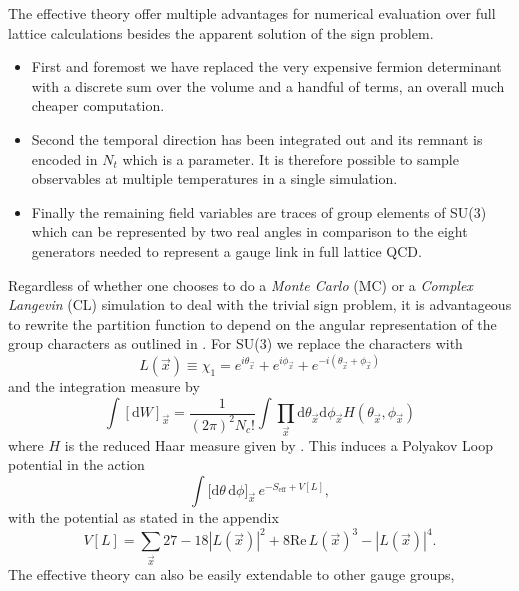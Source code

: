 The effective theory offer multiple advantages for numerical evaluation over
full lattice calculations besides the apparent solution of the sign problem.
%
\begin{itemize}
  \item First and foremost we have replaced the very expensive fermion
    determinant with a discrete sum over the volume and a handful of terms, an
    overall much cheaper computation.
  \item Second the temporal direction has been integrated out and its remnant is
    encoded in $N_t$ which is a parameter. It is therefore possible to sample
    observables at multiple temperatures in a single simulation.
  \item Finally the remaining field variables are traces of group elements of
    SU($3$) which can be represented by two real angles in comparison to the
    eight generators needed to represent a gauge link in full lattice QCD.
\end{itemize}
%
Regardless of whether one chooses to do a \emph{Monte Carlo} (MC) or a \emph{Complex Langevin}
(CL) simulation to deal with the trivial sign problem, it is advantageous to
rewrite the partition function to depend on the angular representation of the
group characters as outlined in . For SU($3$) we
replace the characters with
%
\begin{equation}
  L(\vec{x}) \equiv \chi_1 = e^{i \theta_{\vec{x}}} + e^{i \phi_{\vec{x}}} +
  e^{-i(\theta_{\vec{x}} + \phi_{\vec{x}})}
\end{equation}
%
and the integration measure by
%
\begin{equation}
  \int [\mathrm{d} W]_{\vec{x}} = \frac{1}{(2\pi)^2 N_c!}\int \prod_{\vec{x}} \mathrm{d} \theta_{\vec{x}}
  \mathrm{d} \phi_{\vec{x}} H(\theta_{\vec{x}}, \phi_{\vec{x}})
\end{equation}
%
where $H$ is the reduced Haar measure given by .
This induces a Polyakov Loop potential in the action
%
\begin{equation}
  \int \big[ \mathrm{d} \theta\, \mathrm{d} \phi \big]_{\vec{x}} \,
    e^{-S_{\text{eff}} + V[L]},
\end{equation}
%
with the potential as stated in the appendix
%
\begin{equation}
  V[L] = \sum_{\vec{x}} 27 - 18 |L(\vec{x})|^2 + 8 \mathrm{Re} \, L(\vec{x})^3 - |L(\vec{x})|^4.
\end{equation}
%
The effective theory can also be easily extendable to other gauge groups,
